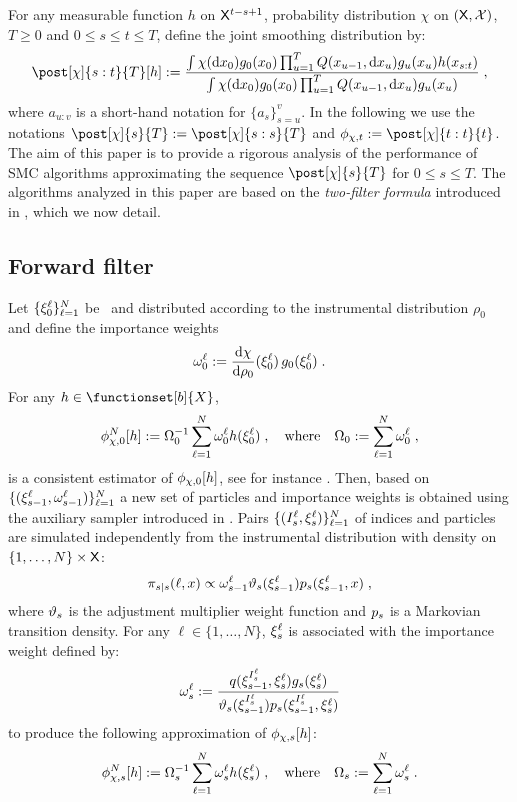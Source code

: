 \label{sec:TwoFilters}
For any measurable function $h$ on $\mathsf{X}^{t-s+1}$, probability distribution $\chi$ on $(\mathsf{X},\mathcal{X})$, $T\geq 0$ and $0 \leq s \leq t \leq T$, define the joint smoothing distribution by:
\begin{equation}
\label{eq:smooth}
\post[\Xinit]{s:t}{T}[h] \eqdef \frac{\int \chi(\rmd x_0)g_{0}(x_0)\prod_{u=1}^{T}Q(x_{u-1},\rmd x_u)g_{u}(x_u)h(x_{s:t})}{\int \chi(\rmd x_0)g_{0}(x_0)\prod_{u=1}^{T}Q(x_{u-1},\rmd x_u)g_{u}(x_u)}\eqsp,
\end{equation}
where  $a_{u:v}$ is a short-hand notation for $\{a_s\}_{s=u}^{v}$. In the following we use the notations $\post[\Xinit]{s}{T}\eqdef \post[\Xinit]{s:s}{T}$ and $\filt{\Xinit,t}\eqdef \post[\Xinit]{t:t}{t}$. The aim of this paper is to provide a rigorous analysis of the performance of SMC algorithms approximating the sequence $\post[\Xinit]{s}{T}$ for $0\le s\le T$. The algorithms analyzed in this paper are based on the {\em two-filter formula} introduced in \cite{briers:doucet:maskell:2010,fearnhead:wyncoll:tawn:2010}, which we now detail.
\subsection{Forward filter}
Let $\{\xi_{0}^{\ell}\}_{\ell = 1}^N$ be \iid\ and  distributed according to the instrumental distribution $\rho_0$ and define the importance weights
\[
\ewght{0}{\ell} \eqdef \frac{\rmd \Xinit}{\rmd \XinitIS{0}}(\epart{0}{\ell}) \, g_{0}(\epart{0}{\ell})\eqsp.
\]
For any  $h\in \functionset[b]{X}$,
\[
\filt{\Xinit,0}^N[h]\eqdef \sumwght{0}^{-1}\sum_{\ell=1}^N \ewght{0}{\ell}h(\epart{0}{\ell})\eqsp,\quad\mbox{where}\quad\sumwght{0}\eqdef \sum_{\ell=1}^N \ewght{0}{\ell}\eqsp,
\]
is a consistent estimator of $\filt{\Xinit,0}[h]$, see for instance \cite{delmoral:2004}. Then, based on $\{(\xi_{s-1}^{\ell},\omega_{s-1}^{\ell})\}_{\ell=1}^N$ a new set of particles and importance weights is obtained using the auxiliary sampler introduced in \cite{pitt:shephard:1999}. Pairs $\{ (I_s^{\ell}, \xi_{s}^{\ell}) \}_{\ell = 1}^N$ of indices and particles are simulated independently from the instrumental distribution with density on $\{1, \dots, N\} \times \mathsf{X}$:
\begin{equation} 
\label{eq:instrumental-distribution-filtering}
\instrpostaux{s}{s}(\ell,x) \propto \ewght{s-1}{\ell} \adjfuncforward{s}(\epart{s-1}{\ell}) \kissforward{s}{s}(\epart{s-1}{\ell},x) \eqsp,
\end{equation}
where $\vartheta_{s}$ is the adjustment multiplier weight function and $\kissforward{s}{s}$ is a Markovian transition density. For any  $\ell \in\{1, \dots, N\}$, $\xi_{s}^{\ell}$ is associated with the  importance weight defined by:
\begin{equation}
\label{eq:weight-update-filtering}
    \ewght{s}{\ell} \eqdef \frac{q(\epart{s-1}{I_s^{\ell}},\epart{s}{\ell}) g_{s}(\epart{s}{\ell})}{\adjfuncforward{s}(\epart{s-1}{I_s^{\ell}}) \kissforward{s}{s}(\epart{s-1}{I_s^{\ell}},\epart{s}{\ell})}
\end{equation}
to produce the following approximation of $\filt{\Xinit,s}[h]$:
\[
\filt{\Xinit,s}^N[h]\eqdef \sumwght{s}^{-1}\sum_{\ell=1}^N \ewght{s}{\ell}h(\epart{s}{\ell})\eqsp,\quad \mbox{where}\quad \sumwght{s}\eqdef \sum_{\ell=1}^N \ewght{s}{\ell}\eqsp.
\]
